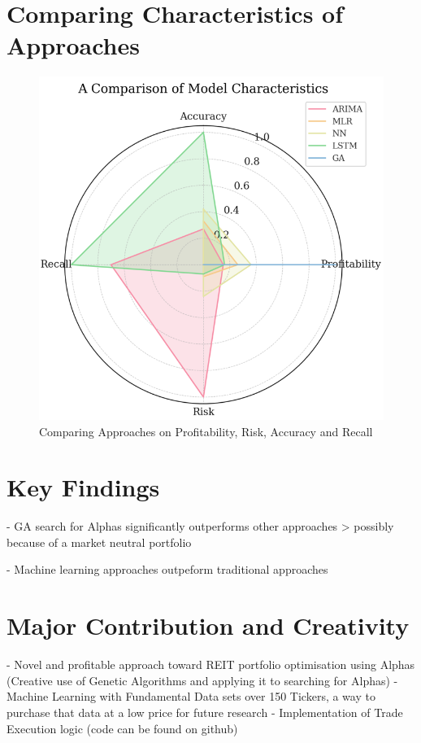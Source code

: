 \documentclass[a4paper,12pt]{report}
\numberwithin{equation}{section}
\theoremstyle{definition}
\begin{document}
\section{Comparing Characteristics of Approaches}
\begin{figure}[H]
  \centerline{\includegraphics[width=15cm]{Final Comparsion of Models}}
  \caption{Comparing Approaches on Profitability, Risk, Accuracy and Recall}
  \label{fig:final_comparison_of_models}
\end{figure}



\section{Key Findings}
- GA search for Alphas significantly outperforms other approaches 
  > possibly  because of a market neutral portfolio 

- Machine learning approaches outpeform traditional approaches

\section{Major Contribution and Creativity}

- Novel and profitable approach toward REIT portfolio optimisation using Alphas (Creative use of Genetic Algorithms and applying it to searching for Alphas)
- Machine Learning with Fundamental Data sets over 150 Tickers, a way to purchase that data at a low price for future research
- Implementation of Trade Execution logic (code can be found on github)
\end{document}
